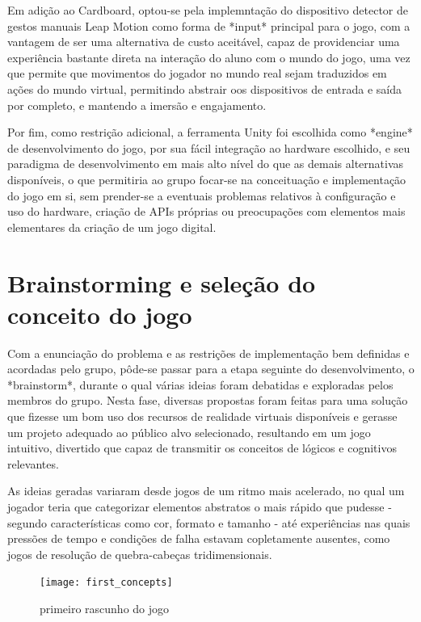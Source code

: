 Em adição ao Cardboard, optou-se pela implemntação do dispositivo detector de gestos manuais Leap Motion como forma de *input* principal para o jogo, com a vantagem de ser uma alternativa de custo aceitável, capaz de providenciar uma experiência bastante direta na interação do aluno com o mundo do jogo, uma vez que permite que movimentos do jogador no mundo real sejam traduzidos em ações do mundo virtual, permitindo abstrair oos dispositivos de entrada e saída por completo, e mantendo a imersão e engajamento.

Por fim, como restrição adicional, a ferramenta Unity foi escolhida como *engine* de desenvolvimento do jogo, por sua fácil integração ao hardware escolhido, e seu paradigma de desenvolvimento em mais alto nível do que as demais alternativas disponíveis, o que permitiria ao grupo focar-se na conceituação e implementação do jogo em si, sem prender-se a eventuais problemas relativos à configuração e uso do hardware, criação de APIs próprias ou preocupações com elementos mais elementares da criação de um jogo digital.

\section{Brainstorming e seleção do conceito do jogo}\label{sec-brainstorming-conceito}

Com a enunciação do problema e as restrições de implementação bem definidas e acordadas pelo grupo, pôde-se passar para a etapa seguinte do desenvolvimento, o *brainstorm*, durante o qual várias ideias foram debatidas e exploradas pelos membros do grupo. Nesta fase, diversas propostas foram feitas para uma solução que fizesse um bom uso dos recursos de realidade virtuais disponíveis e gerasse um projeto adequado ao público alvo selecionado, resultando em um jogo intuitivo, divertido que capaz de transmitir os conceitos de lógicos e cognitivos relevantes.

As ideias geradas variaram desde jogos de um ritmo mais acelerado, no qual um jogador teria que categorizar elementos abstratos o mais rápido que pudesse - segundo características como cor, formato e tamanho - até experiências nas quais pressões de tempo e condições de falha estavam copletamente ausentes, como jogos de resolução de quebra-cabeças tridimensionais.

\begin{figure}[h]
	\centering
	\texttt{[image: first\_concepts]}
	\caption{primeiro rascunho do jogo}
\end{figure}


